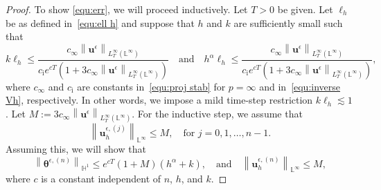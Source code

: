 \documentclass[11pt,reqno]{amsart}
\theoremstyle{definition}
\numberwithin{equation}{section}
\newcommand{\bff}{\boldsymbol}
\newcommand{\bb}{\mathbb}
\newcommand{\leqs}{\lesssim}
\newcommand{\norm}[2]{\left\|{#1}\right\|_{#2}}
\begin{document}
\begin{proof}
To show \eqref{equ:err}, we will proceed inductively. Let $T>0$ be given. Let $\ell_h$ be as defined in~\eqref{equ:ell h} and suppose that $h$ and $k$ are sufficiently small such that
\begin{equation}\label{equ:timestep rest}
	k\ell_h \leq \frac{c_\infty \norm{\bff{u}^\epsilon}{L^\infty_T(\bb{L}^\infty)}}{c_{\mathrm{i}} e^{cT} \left(1+3c_\infty  \norm{\bff{u}^\epsilon}{L^\infty_T(\bb{L}^\infty)}\right)}
	\quad 
	\text{and}
	\quad
	h^\alpha \ell_h \leq \frac{c_\infty \norm{\bff{u}^\epsilon}{L^\infty_T(\bb{L}^\infty)}}{c_{\mathrm{i}} e^{cT} \left(1+3c_\infty  \norm{\bff{u}^\epsilon}{L^\infty_T(\bb{L}^\infty)}\right)},
\end{equation}
where $c_\infty$ and $c_{\mathrm{i}}$ are constants in~\eqref{equ:proj stab} for $p=\infty$ and in~\eqref{equ:inverse Vh}, respectively.
In other words, we impose a mild time-step restriction $k\ell_h \leqs 1$.
Let $M:=3 c_\infty \norm{\bff{u}^\epsilon}{L^\infty_T(\bb{L}^\infty)}$. For the inductive step, we assume that
\begin{equation}\label{equ:uhj infty}
	\norm{\bff{u}_h^{\epsilon, (j)}}{\bb{L}^\infty} \leq M, \quad \text{for } j=0,1,\ldots,n-1.
\end{equation}
Assuming this, we will show that
\begin{equation}\label{equ:induct theta j}
	\norm{\bff{\theta}^{\epsilon, (n)}}{\bb{H}^1} \leq e^{cT} (1+M) (h^\alpha+k), \quad \text{and}\quad \norm{\bff{u}_h^{\epsilon, (n)}}{\bb{L}^\infty} \leq M,
\end{equation}
where $c$ is a constant independent of $n$, $h$, and $k$.


\end{proof}
\end{document}
